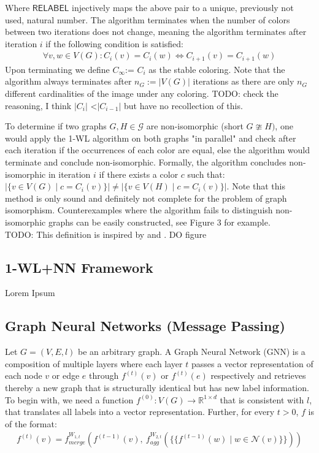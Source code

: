 \documentclass[11pt, dvipsnames, DIV=12]{scrreprt}
\theoremstyle{definition}
\newcommand{\MSopen}{\{\!\!\{}
\newcommand{\MSclose}{\}\!\!\}}
\begin{document}
\noindent Where $\textsf{RELABEL}$ injectively maps the above pair to a unique, previously not used, natural number. The algorithm terminates when the number of colors between two iterations does not change, meaning the algorithm terminates after iteration $i$ if the following condition is satisfied:
\begin{align}
\forall v,w \in V(G):  C_i(v) = C_i(w) \iff C_{i+1}(v) = C_{i+1}(w)
\end{align}
Upon terminating we define $C_{\infty}$:= $C_i$ as the stable coloring. Note that the algorithm always terminates after $n_G := |V(G)|$ iterations as there are only $n_G$ different cardinalities of the image under any coloring. TODO: check the reasoning, I think $|C_i|$ <$|C_{i-1}|$ but have no recollection of this.

To determine if two graphs $G ,H \in \mathcal{G}$ are non-isomorphic (short $G \ncong H)$, one would apply the 1-WL algorithm on both graphs "in parallel" and check after each iteration if the occurrences of each color are equal, else the algorithm would terminate and conclude non-isomorphic. Formally, the algorithm concludes non-isomorphic in iteration $i$ if there exists a color $c$ such that: $|\{ v \in V(G) \mid c = C_i(v)\} | \neq |\{ v \in V(H) \mid c = C_i(v)\} |$. Note that this method is only sound and definitely not complete for the problem of graph isomorphism. Counterexamples where the algorithm fails to distinguish non-isomorphic graphs can be easily constructed, see Figure 3 for example.\\



TODO: This definition is inspired by \cite{Morris2021} and \cite{Morris2018}. DO figure

\subsection{1-WL+NN Framework}
Lorem Ipsum

\subsection{Graph Neural Networks (Message Passing)}
Let $G = (V,E, l)$ be an arbitrary graph. A Graph Neural Network (GNN) is a composition of multiple layers where each layer $t$ passes a vector representation of each node $v$ or edge $e$ through $f^{(t)}(v)$ or $f^{(t)}(e)$ respectively and retrieves thereby a new graph that is structurally identical but has new label information. To begin with, we need a function $f^{(0)}: V(G) \rightarrow \mathbb{R}^{1 \times d}$ that is consistent with $l$, that translates all labels into a vector representation. Further, for every $t > 0$, $f$ is of the format:
\begin{align}
f^{(t)}(v) = f^{W_{1,t}}_{merge} (f^{(t-1)}(v), \  f^{W_{2,t}}_{agg}( \MSopen f^{(t-1)}(w) \mid w \in \mathcal{N}(v) \MSclose ))
\end{align}
\end{document}
